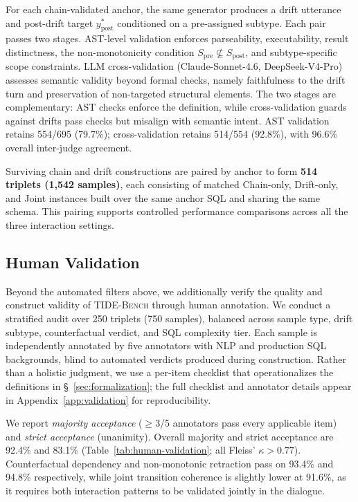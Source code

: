  For each chain-validated anchor, the same generator produces a drift utterance and post-drift target $y_{\mathrm{post}}^*$ conditioned on a pre-assigned subtype. Each pair passes two stages. AST-level validation enforces parseability, executability, result distinctness, the non-monotonicity condition $S_{\mathrm{pre}} \nsubseteq S_{\mathrm{post}}$, and subtype-specific scope constraints. LLM cross-validation (Claude-Sonnet-4.6, DeepSeek-V4-Pro) assesses semantic validity beyond formal checks, namely faithfulness to the drift turn and preservation of non-targeted structural elements. The two stages are complementary: AST checks enforce the definition, while cross-validation guards against drifts pass checks but misalign with semantic intent. AST validation retains 554/695 (79.7\%); cross-validation retains 514/554 (92.8\%), with 96.6\% overall inter-judge agreement.

 Surviving chain and drift constructions are paired by anchor to form \textbf{514 triplets (1{,}542 samples)}, each consisting of matched Chain-only, Drift-only, and Joint instances built over the same anchor SQL and sharing the same schema. This pairing supports controlled performance comparisons across all the three interaction settings.

\subsection{Human Validation}
\label{sec:human-validation}

Beyond the automated filters above, we additionally verify the quality and construct validity of \textsc{TIDE-Bench} through human annotation. We conduct a stratified audit over 250 triplets (750 samples), balanced across sample type, drift subtype, counterfactual verdict, and SQL complexity tier. Each sample is independently annotated by five annotators with NLP and production SQL backgrounds, blind to automated verdicts produced during construction. Rather than a holistic judgment, we use a per-item checklist that operationalizes the definitions in \S~\ref{sec:formalization}; the full checklist and annotator details appear in Appendix~\ref{app:validation} for reproducibility.

We report \emph{majority acceptance} ($\geq$3/5 annotators pass every applicable item) and \emph{strict acceptance} (unanimity). Overall majority and strict acceptance are 92.4\% and 83.1\% (Table~\ref{tab:human-validation}; all Fleiss' $\kappa > 0.77$). Counterfactual dependency and non-monotonic retraction pass on 93.4\% and 94.8\% respectively, while joint transition coherence is slightly lower at 91.6\%, as it requires both interaction patterns to be validated jointly in the dialogue.

